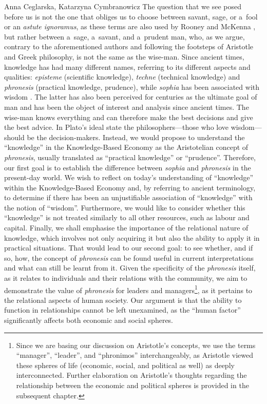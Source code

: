 \begin{artengenv2auth}{Anna Ceglarska, Katarzyna Cymbranowicz}
The question that we see posed before us is not the one that obliges us to choose between savant, sage, or a~fool or an \textit{astute ignoramus}, as these terms are also used by Rooney and McKenna 
\parencite*[][p.315]{rooney_should_2005}, %
 but rather between a~sage, a~savant, and a~prudent man, who, as we argue, contrary to the aforementioned authors and following the footsteps of Aristotle and Greek philosophy, is not the same as the wise-man. Since ancient times, knowledge has had many different names, referring to its different aspects and qualities: \textit{episteme} (scientific knowledge), \textit{techne} (technical knowledge) and \textit{phronesis} (practical knowledge, prudence), while \textit{sophia} has been associated with wisdom 
\parencite[][]{rackham_nicomachean_1934}. %
 The latter has also been perceived for centuries as the ultimate goal of man and has been the object of interest and analysis since ancient times. The wise-man knows everything and can therefore make the best decisions and give the best advice. In Plato's ideal state the philosophers---those who love wisdom---should be the decision-makers. Instead, we would propose to understand the ``knowledge'' in the Knowledge-Based Economy as the Aristotelian concept of \textit{phronesis}, usually translated as ``practical knowledge'' or ``prudence''. Therefore, our first goal is to establish the difference between \textit{sophia} and \textit{phronesis} in the present-day world. We wish to reflect on today's understanding of ``knowledge'' within the Knowledge-Based Economy and, by referring to ancient terminology, to determine if there has been an unjustifiable association of ``knowledge'' with the notion of ``wisdom''. Furthermore, we would like to consider whether this ``knowledge'' is not treated similarly to all other resources, such as labour and capital. Finally, we shall emphasise the importance of the relational nature of knowledge, which involves not only acquiring it but also the ability to apply it in practical situations. That would lead to our second goal: to see whether, and if so, how, the concept of \textit{phronesis} can be found useful in current interpretations and what can still be learnt from it. Given the specificity of the \textit{phronesis} itself, as it relates to individuals and their relations with the community, we aim to demonstrate the value of \textit{phronesis} for leaders and managers\footnote{Since we are basing our discussion on Aristotle's concepts, we use the terms ``manager'', ``leader'', and ``phronimos'' interchangeably, as Aristotle viewed these spheres of life (economic, social, and political as well) as deeply interconnected. Further elaboration on Aristotle's thoughts regarding the relationship between the economic and political spheres is provided in the subsequent chapter.}, as it pertains to the relational aspects of human society. Our argument is that the ability to function in relationships cannot be left unexamined, as the ``human factor'' significantly affects both economic and social spheres.




\end{artengenv2auth}
